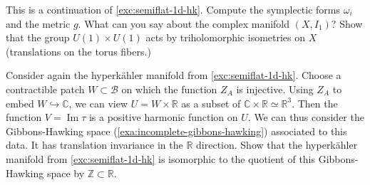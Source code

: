 \documentclass[12pt,letterpaper,reqno]{article}
\numberwithin{equation}{section}
\newcommand{\cB}{\ensuremath{\mathcal B}}
\newcommand{\R}{\ensuremath{\mathbb R}}
\newcommand{\C}{\ensuremath{\mathbb C}}
\newcommand{\Z}{\ensuremath{\mathbb Z}}
\newcommand{\hk}{hyperk\"ahler\xspace}
\DeclareMathOperator{\im}{Im}
\begin{document}
\begin{exercise} This is a continuation of
\autoref{exc:semiflat-1d-hk}.
Compute the symplectic forms $\omega_i$ and the metric $g$.
What can you say about the complex manifold $(X,I_1)$?
Show that the group $U(1) \times U(1)$ acts
by triholomorphic isometries on $X$ (translations on
the torus fibers.)
\end{exercise}

\begin{exercise} Consider again the \hk manifold from 
\autoref{exc:semiflat-1d-hk}. Choose a contractible patch 
$W \subset \cB$
on which the function $Z_A$ is injective. Using $Z_A$ to
embed $W \hookrightarrow \C$, we can view $U = W \times \R$ as a subset
of $\C \times \R \simeq \R^3$. Then the function $V = \im \tau$ is
a positive harmonic function on $U$. We can thus consider the
Gibbons-Hawking space (\autoref{exa:incomplete-gibbons-hawking})
associated to this data. It has translation invariance in 
the $\R$ direction. Show that the \hk manifold from 
\autoref{exc:semiflat-1d-hk} is isomorphic to the quotient 
of this Gibbons-Hawking space by $\Z \subset \R$.
\end{exercise}
\end{document}
